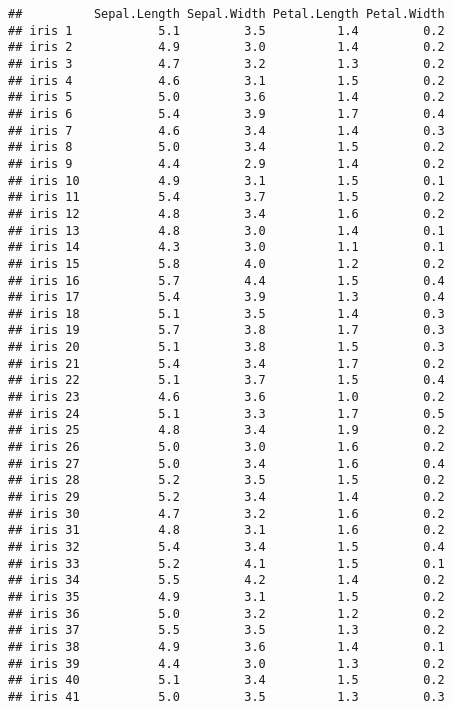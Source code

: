 \documentclass[
]{article}
\begin{document}
\begin{verbatim}
##          Sepal.Length Sepal.Width Petal.Length Petal.Width
## iris 1            5.1         3.5          1.4         0.2
## iris 2            4.9         3.0          1.4         0.2
## iris 3            4.7         3.2          1.3         0.2
## iris 4            4.6         3.1          1.5         0.2
## iris 5            5.0         3.6          1.4         0.2
## iris 6            5.4         3.9          1.7         0.4
## iris 7            4.6         3.4          1.4         0.3
## iris 8            5.0         3.4          1.5         0.2
## iris 9            4.4         2.9          1.4         0.2
## iris 10           4.9         3.1          1.5         0.1
## iris 11           5.4         3.7          1.5         0.2
## iris 12           4.8         3.4          1.6         0.2
## iris 13           4.8         3.0          1.4         0.1
## iris 14           4.3         3.0          1.1         0.1
## iris 15           5.8         4.0          1.2         0.2
## iris 16           5.7         4.4          1.5         0.4
## iris 17           5.4         3.9          1.3         0.4
## iris 18           5.1         3.5          1.4         0.3
## iris 19           5.7         3.8          1.7         0.3
## iris 20           5.1         3.8          1.5         0.3
## iris 21           5.4         3.4          1.7         0.2
## iris 22           5.1         3.7          1.5         0.4
## iris 23           4.6         3.6          1.0         0.2
## iris 24           5.1         3.3          1.7         0.5
## iris 25           4.8         3.4          1.9         0.2
## iris 26           5.0         3.0          1.6         0.2
## iris 27           5.0         3.4          1.6         0.4
## iris 28           5.2         3.5          1.5         0.2
## iris 29           5.2         3.4          1.4         0.2
## iris 30           4.7         3.2          1.6         0.2
## iris 31           4.8         3.1          1.6         0.2
## iris 32           5.4         3.4          1.5         0.4
## iris 33           5.2         4.1          1.5         0.1
## iris 34           5.5         4.2          1.4         0.2
## iris 35           4.9         3.1          1.5         0.2
## iris 36           5.0         3.2          1.2         0.2
## iris 37           5.5         3.5          1.3         0.2
## iris 38           4.9         3.6          1.4         0.1
## iris 39           4.4         3.0          1.3         0.2
## iris 40           5.1         3.4          1.5         0.2
## iris 41           5.0         3.5          1.3         0.3

\end{verbatim}
\end{document}
